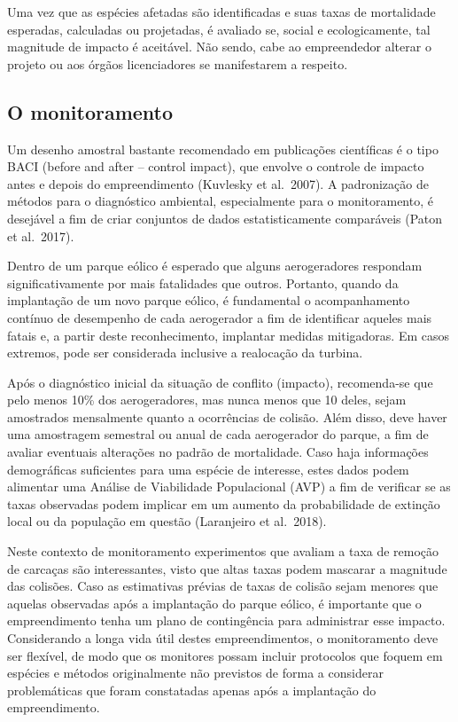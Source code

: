 \documentclass[
]{scrbook}
\begin{document}
Uma vez que as espécies afetadas são identificadas e suas taxas de mortalidade esperadas, calculadas ou projetadas, é avaliado se, social e ecologicamente, tal magnitude de impacto é aceitável. Não sendo, cabe ao empreendedor alterar o projeto ou aos órgãos licenciadores se manifestarem a respeito.

\hypertarget{monitoramento}{%
\subsection{O monitoramento}\label{monitoramento}}

Um desenho amostral bastante recomendado em publicações científicas é o tipo BACI (before and after -- control impact), que envolve o controle de impacto antes e depois do empreendimento (Kuvlesky et al.~2007). A padronização de métodos para o diagnóstico ambiental, especialmente para o monitoramento, é desejável a fim de criar conjuntos de dados estatisticamente comparáveis (Paton et al.~2017).

Dentro de um parque eólico é esperado que alguns aerogeradores respondam significativamente por mais fatalidades que outros. Portanto, quando da implantação de um novo parque eólico, é fundamental o acompanhamento contínuo de desempenho de cada aerogerador a fim de identificar aqueles mais fatais e, a partir deste reconhecimento, implantar medidas mitigadoras. Em casos extremos, pode ser considerada inclusive a realocação da turbina.

Após o diagnóstico inicial da situação de conflito (impacto), recomenda-se que pelo menos 10\% dos aerogeradores, mas nunca menos que 10 deles, sejam amostrados mensalmente quanto a ocorrências de colisão. Além disso, deve haver uma amostragem semestral ou anual de cada aerogerador do parque, a fim de avaliar eventuais alterações no padrão de mortalidade. Caso haja informações demográficas suficientes para uma espécie de interesse, estes dados podem alimentar uma Análise de Viabilidade Populacional (AVP) a fim de verificar se as taxas observadas podem implicar em um aumento da probabilidade de extinção local ou da população em questão (Laranjeiro et al.~2018).

Neste contexto de monitoramento experimentos que avaliam a taxa de remoção de carcaças são interessantes, visto que altas taxas podem mascarar a magnitude das colisões. Caso as estimativas prévias de taxas de colisão sejam menores que aquelas observadas após a implantação do parque eólico, é importante que o empreendimento tenha um plano de contingência para administrar esse impacto. Considerando a longa vida útil destes empreendimentos, o monitoramento deve ser flexível, de modo que os monitores possam incluir protocolos que foquem em espécies e métodos originalmente não previstos de forma a considerar problemáticas que foram constatadas apenas após a implantação do empreendimento.
\end{document}
